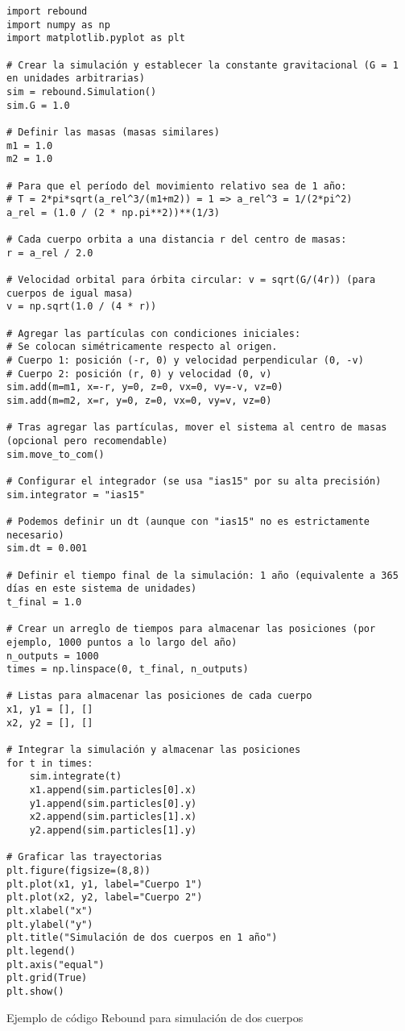 \begin{listing}[H]
\begin{verbatim}
import rebound
import numpy as np
import matplotlib.pyplot as plt

# Crear la simulación y establecer la constante gravitacional (G = 1 en unidades arbitrarias)
sim = rebound.Simulation()
sim.G = 1.0

# Definir las masas (masas similares)
m1 = 1.0
m2 = 1.0

# Para que el período del movimiento relativo sea de 1 año:
# T = 2*pi*sqrt(a_rel^3/(m1+m2)) = 1 => a_rel^3 = 1/(2*pi^2)
a_rel = (1.0 / (2 * np.pi**2))**(1/3)

# Cada cuerpo orbita a una distancia r del centro de masas:
r = a_rel / 2.0

# Velocidad orbital para órbita circular: v = sqrt(G/(4r)) (para cuerpos de igual masa)
v = np.sqrt(1.0 / (4 * r))

# Agregar las partículas con condiciones iniciales:
# Se colocan simétricamente respecto al origen.
# Cuerpo 1: posición (-r, 0) y velocidad perpendicular (0, -v)
# Cuerpo 2: posición (r, 0) y velocidad (0, v)
sim.add(m=m1, x=-r, y=0, z=0, vx=0, vy=-v, vz=0)
sim.add(m=m2, x=r, y=0, z=0, vx=0, vy=v, vz=0)

# Tras agregar las partículas, mover el sistema al centro de masas (opcional pero recomendable)
sim.move_to_com()

# Configurar el integrador (se usa "ias15" por su alta precisión)
sim.integrator = "ias15"

# Podemos definir un dt (aunque con "ias15" no es estrictamente necesario)
sim.dt = 0.001

# Definir el tiempo final de la simulación: 1 año (equivalente a 365 días en este sistema de unidades)
t_final = 1.0

# Crear un arreglo de tiempos para almacenar las posiciones (por ejemplo, 1000 puntos a lo largo del año)
n_outputs = 1000
times = np.linspace(0, t_final, n_outputs)

# Listas para almacenar las posiciones de cada cuerpo
x1, y1 = [], []
x2, y2 = [], []

# Integrar la simulación y almacenar las posiciones
for t in times:
    sim.integrate(t)
    x1.append(sim.particles[0].x)
    y1.append(sim.particles[0].y)
    x2.append(sim.particles[1].x)
    y2.append(sim.particles[1].y)

# Graficar las trayectorias
plt.figure(figsize=(8,8))
plt.plot(x1, y1, label="Cuerpo 1")
plt.plot(x2, y2, label="Cuerpo 2")
plt.xlabel("x")
plt.ylabel("y")
plt.title("Simulación de dos cuerpos en 1 año")
plt.legend()
plt.axis("equal")
plt.grid(True)
plt.show()
\end{verbatim}
\caption{Ejemplo de código Rebound para simulación de dos cuerpos}
\label{lst:rebound_example}
\end{listing}


